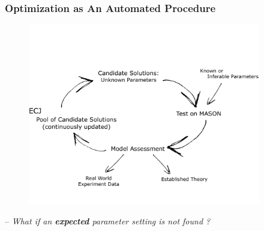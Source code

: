 \documentclass{beamer}
\begin{document}
\begin{frame}
	\frametitle{Optimization as An Automated Procedure}
	\vspace{-55pt}
		\begin{figure}
			\centering
			\includegraphics[width=4in,keepaspectratio]{approach-new.pdf}
		\end{figure}
	\vspace{-25pt}
	-- \emph{What if an \textbf{expected} parameter setting is not found ?}
\end{frame}

\end{document}
